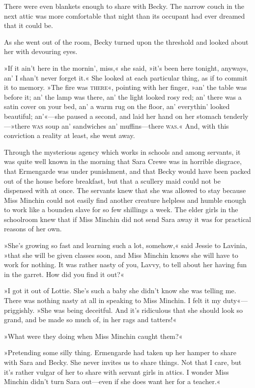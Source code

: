 There were even blankets enough to share with Becky. The narrow couch in the next attic was more comfortable that night than its occupant had ever dreamed that it could be.

As she went out of the room, Becky turned upon the threshold and looked about her with devouring eyes.

»If it ain't here in the mornin', miss,« she said, »it's been here tonight, anyways, an' I shan't never forget it.« She looked at each particular thing, as if to commit it to memory. »The fire was \textsc{there}«, pointing with her finger, »an' the table was before it; an' the lamp was there, an' the light looked rosy red; an' there was a satin cover on your bed, an' a warm rug on the floor, an' everythin' looked beautiful; an'«—she paused a second, and laid her hand on her stomach tenderly—»there \textsc{was} soup an' sandwiches an' muffins—there \textsc{was}.« And, with this conviction a reality at least, she went away.

Through the mysterious agency which works in schools and among servants, it was quite well known in the morning that Sara Crewe was in horrible disgrace, that Ermengarde was under punishment, and that Becky would have been packed out of the house before breakfast, but that a scullery maid could not be dispensed with at once. The servants knew that she was allowed to stay because Miss Minchin could not easily find another creature helpless and humble enough to work like a bounden slave for so few shillings a week. The elder girls in the schoolroom knew that if Miss Minchin did not send Sara away it was for practical reasons of her own.

»She's growing so fast and learning such a lot, somehow,« said Jessie to Lavinia, »that she will be given classes soon, and Miss Minchin knows she will have to work for nothing. It was rather nasty of you, Lavvy, to tell about her having fun in the garret. How did you find it out?«

»I got it out of Lottie. She's such a baby she didn't know she was telling me. There was nothing nasty at all in speaking to Miss Minchin. I felt it my duty«—priggishly. »She was being deceitful. And it's ridiculous that she should look so grand, and be made so much of, in her rags and tatters!«

»What were they doing when Miss Minchin caught them?«

»Pretending some silly thing. Ermengarde had taken up her hamper to share with Sara and Becky. She never invites us to share things. Not that I care, but it's rather vulgar of her to share with servant girls in attics. I wonder Miss Minchin didn't turn Sara out—even if she does want her for a teacher.«

